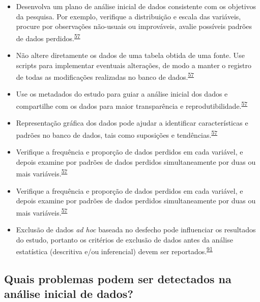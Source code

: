 \documentclass[
  a4paper,
]{book}
\begin{document}
\begin{itemize}
\item
  Desenvolva um plano de análise inicial de dados consistente com os objetivos da pesquisa. Por exemplo, verifique a distribuição e escala das variáveis, procure por observações não-usuais ou improváveis, avalie possíveis padrões de dados perdidos.\textsuperscript{\protect\hyperlink{ref-Baillie2022}{57}}
\item
  Não altere diretamente os dados de uma tabela obtida de uma fonte. Use scripts para implementar eventuais alterações, de modo a manter o registro de todas as modificações realizadas no banco de dados.\textsuperscript{\protect\hyperlink{ref-Baillie2022}{57}}
\item
  Use os metadados do estudo para guiar a análise inicial dos dados e compartilhe com os dados para maior transparência e reprodutibilidade.\textsuperscript{\protect\hyperlink{ref-Baillie2022}{57}}
\item
  Representação gráfica dos dados pode ajudar a identificar características e padrões no banco de dados, tais como suposições e tendências.\textsuperscript{\protect\hyperlink{ref-Baillie2022}{57}}
\item
  Verifique a frequência e proporção de dados perdidos em cada variável, e depois examine por padrões de dados perdidos simultaneamente por duas ou mais variáveis.\textsuperscript{\protect\hyperlink{ref-Baillie2022}{57}}
\item
  Verifique a frequência e proporção de dados perdidos em cada variável, e depois examine por padrões de dados perdidos simultaneamente por duas ou mais variáveis.\textsuperscript{\protect\hyperlink{ref-Baillie2022}{57}}
\item
  Exclusão de dados \emph{ad hoc} baseada no desfecho pode influenciar os resultados do estudo, portanto os critérios de exclusão de dados antes da análise estatística (descritiva e/ou inferencial) devem ser reportados.\textsuperscript{\protect\hyperlink{ref-Landis2012}{91}}
\end{itemize}

\hypertarget{quais-problemas-podem-ser-detectados-na-anuxe1lise-inicial-de-dados}{%
\subsection{Quais problemas podem ser detectados na análise inicial de dados?}\label{quais-problemas-podem-ser-detectados-na-anuxe1lise-inicial-de-dados}}
\end{document}
